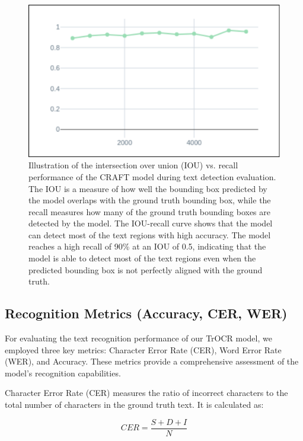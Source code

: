 \begin{figure}[H]
    \centering
    \includegraphics[width=\textwidth]{figures/iou_craft.png}
    \caption{Illustration of the intersection over union (IOU) vs. recall performance of the CRAFT model 
    during text detection evaluation. The IOU is a measure of how well the bounding box predicted 
    by the model overlaps with the ground truth bounding box, while the recall measures how many of 
    the ground truth bounding boxes are detected by the model. The IOU-recall curve shows that the 
    model can detect most of the text regions with high accuracy. The model reaches a high recall of 
    90\% at an IOU of 0.5, indicating that the model is able to detect most of the text regions even 
    when the predicted bounding box is not perfectly aligned with the ground truth.}
    \label{fig:iou-recall-craft}
\end{figure}


\subsection{Recognition Metrics (Accuracy, CER, WER)}
\label{subsec:recognition-metrics}
For evaluating the text recognition performance of our TrOCR model, we employed three key metrics: Character Error Rate (CER), Word Error Rate (WER), and Accuracy. These metrics provide a comprehensive assessment of the model's recognition capabilities.

Character Error Rate (CER) measures the ratio of incorrect characters to the total number of characters in the ground truth text. It is calculated as:

\begin{equation}
    CER = \frac{S + D + I}{N}
\end{equation}


